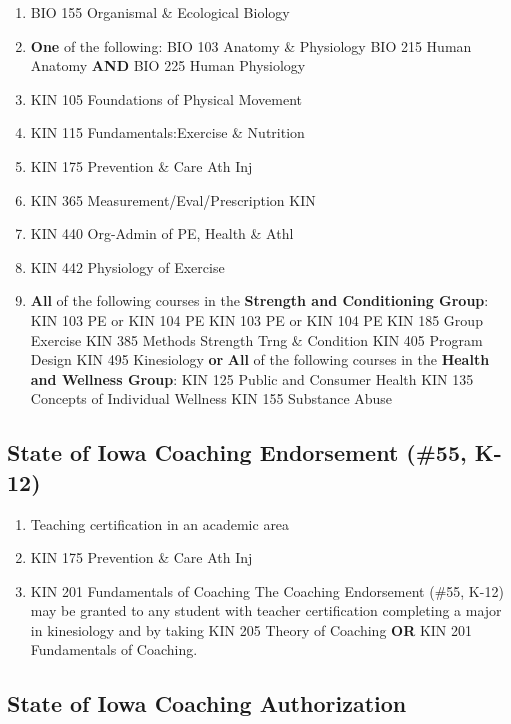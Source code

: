 \documentclass[
  letterpaper,
]{scrbook}
\providecommand{\tightlist}{%
  \setlength{\itemsep}{0pt}\setlength{\parskip}{0pt}}
\begin{document}
\begin{enumerate}
\def\labelenumi{\arabic{enumi}.}
\tightlist
\item
  BIO 155 Organismal \& Ecological Biology
\item
  \textbf{One} of the following: BIO 103 Anatomy \& Physiology BIO 215
  Human Anatomy \textbf{AND} BIO 225 Human Physiology
\item
  KIN 105 Foundations of Physical Movement
\item
  KIN 115 Fundamentals:Exercise \& Nutrition
\item
  KIN 175 Prevention \& Care Ath Inj
\item
  KIN 365 Measurement/Eval/Prescription KIN
\item
  KIN 440 Org-Admin of PE, Health \& Athl
\item
  KIN 442 Physiology of Exercise
\item
  \textbf{All} of the following courses in the \textbf{Strength and
  Conditioning Group}: KIN 103 PE or KIN 104 PE KIN 103 PE or KIN 104 PE
  KIN 185 Group Exercise KIN 385 Methods Strength Trng \& Condition KIN
  405 Program Design KIN 495 Kinesiology \textbf{or} \textbf{All} of the
  following courses in the \textbf{Health and Wellness Group}: KIN 125
  Public and Consumer Health KIN 135 Concepts of Individual Wellness KIN
  155 Substance Abuse
\end{enumerate}

\subsection{State of Iowa Coaching Endorsement (\#55,
K-12)}\label{state-of-iowa-coaching-endorsement-55-k-12}

\begin{enumerate}
\def\labelenumi{\arabic{enumi}.}
\tightlist
\item
  Teaching certification in an academic area
\item
  KIN 175 Prevention \& Care Ath Inj
\item
  KIN 201 Fundamentals of Coaching The Coaching Endorsement (\#55, K-12)
  may be granted to any student with teacher certification completing a
  major in kinesiology and by taking KIN 205 Theory of Coaching
  \textbf{OR} KIN 201 Fundamentals of Coaching.
\end{enumerate}

\subsection{State of Iowa Coaching
Authorization}\label{state-of-iowa-coaching-authorization}
\end{document}
